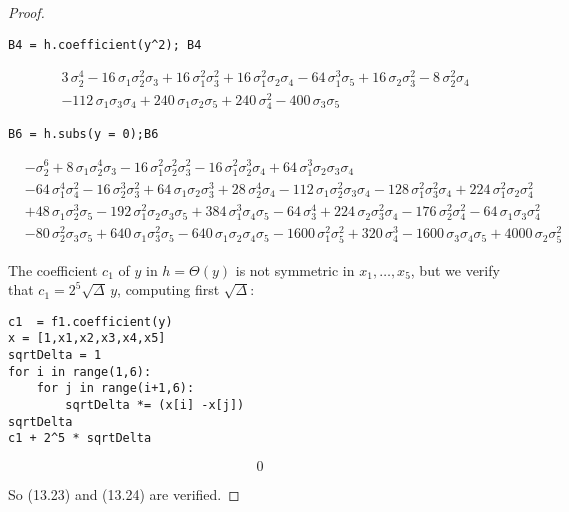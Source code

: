 \documentclass[11pt,a4paper]{article}
\begin{document}
\begin{proof}
\begin{verbatim}
B4 = h.coefficient(y^2); B4
\end{verbatim}
\begin{align*}
&3 \, \sigma_{2}^{4} - 16 \, \sigma_{1} \sigma_{2}^{2} \sigma_{3} + 16 \, \sigma_{1}^{2} \sigma_{3}^{2} + 16 \, \sigma_{1}^{2} \sigma_{2} \sigma_{4} - 64 \, \sigma_{1}^{3} \sigma_{5} + 16 \, \sigma_{2} \sigma_{3}^{2} - 8 \, \sigma_{2}^{2} \sigma_{4} \\
&- 112 \, \sigma_{1} \sigma_{3} \sigma_{4} + 240 \, \sigma_{1} \sigma_{2} \sigma_{5} + 240 \, \sigma_{4}^{2} - 400 \, \sigma_{3} \sigma_{5}
\end{align*}
\begin{verbatim}
B6 = h.subs(y = 0);B6
\end{verbatim}
\begin{align*}
&-\sigma_{2}^{6} + 8 \, \sigma_{1} \sigma_{2}^{4} \sigma_{3} - 16 \,
\sigma_{1}^{2} \sigma_{2}^{2} \sigma_{3}^{2} - 16 \, \sigma_{1}^{2}
\sigma_{2}^{3} \sigma_{4} + 64 \, \sigma_{1}^{3} \sigma_{2} \sigma_{3}
\sigma_{4}\\
 &- 64 \, \sigma_{1}^{4} \sigma_{4}^{2} - 16 \, \sigma_{2}^{3}
\sigma_{3}^{2} + 64 \, \sigma_{1} \sigma_{2} \sigma_{3}^{3} + 28 \,
\sigma_{2}^{4} \sigma_{4} - 112 \, \sigma_{1} \sigma_{2}^{2} \sigma_{3}
\sigma_{4} - 128 \, \sigma_{1}^{2} \sigma_{3}^{2} \sigma_{4} + 224 \,
\sigma_{1}^{2} \sigma_{2} \sigma_{4}^{2} \\
&+ 48 \, \sigma_{1}
\sigma_{2}^{3} \sigma_{5} - 192 \, \sigma_{1}^{2} \sigma_{2} \sigma_{3}
\sigma_{5} + 384 \, \sigma_{1}^{3} \sigma_{4} \sigma_{5} - 64 \, 
\sigma_{3}^{4} + 224 \, \sigma_{2} \sigma_{3}^{2} \sigma_{4} - 176 \,
\sigma_{2}^{2} \sigma_{4}^{2} - 64 \, \sigma_{1} \sigma_{3} \sigma_{4}^{2} \\
&- 80 \, \sigma_{2}^{2} \sigma_{3} \sigma_{5} + 640 \,
\sigma_{1} \sigma_{3}^{2} \sigma_{5} - 640 \, \sigma_{1} \sigma_{2} 
\sigma_{4} \sigma_{5} - 1600 \, \sigma_{1}^{2} \sigma_{5}^{2} + 320 \,
\sigma_{4}^{3} - 1600 \, \sigma_{3} \sigma_{4} \sigma_{5} + 4000 \,
\sigma_{2} \sigma_{5}^{2}
\end{align*}

The coefficient $c_1$ of $y$ in $h = \Theta(y)$ is not symmetric in $x_1,\ldots,x_5$, but we verify that $c_1 = 2^5\sqrt{\Delta}\, y$, computing first $\sqrt{\Delta}$:
\begin{verbatim}
c1  = f1.coefficient(y)
x = [1,x1,x2,x3,x4,x5]
sqrtDelta = 1
for i in range(1,6):
    for j in range(i+1,6):
        sqrtDelta *= (x[i] -x[j])
sqrtDelta
c1 + 2^5 * sqrtDelta
\end{verbatim}
$$0$$

So (13.23) and (13.24) are verified.
\end{proof}
\end{document}
